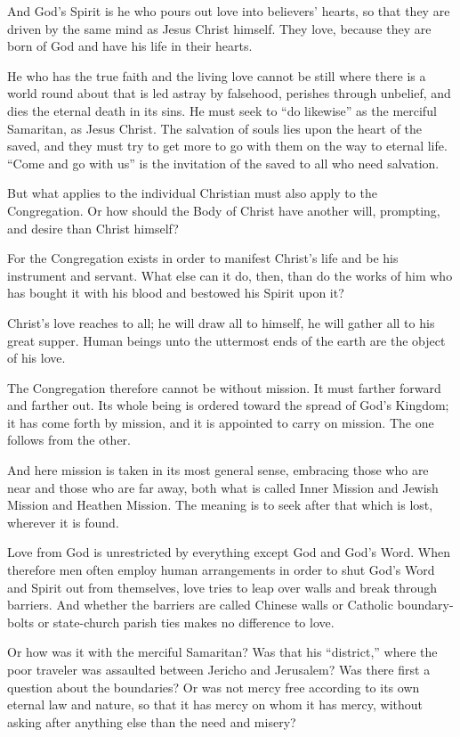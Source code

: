 And God’s Spirit is he who pours out love into believers’ hearts, so that they are driven by the same mind as Jesus Christ himself. They love, because they are born of God and have his life in their hearts.

He who has the true faith and the living love cannot be still where there is a world round about that is led astray by falsehood, perishes through unbelief, and dies the eternal death in its sins. He must seek to “do likewise” as the merciful Samaritan, as Jesus Christ. The salvation of souls lies upon the heart of the saved, and they must try to get more to go with them on the way to eternal life. “Come and go with us” is the invitation of the saved to all who need salvation.

But what applies to the individual Christian must also apply to the Congregation. Or how should the Body of Christ have another will, prompting, and desire than Christ himself?

For the Congregation exists in order to manifest Christ’s life and be his instrument and servant. What else can it do, then, than do the works of him who has bought it with his blood and bestowed his Spirit upon it?

Christ’s love reaches to all; he will draw all to himself, he will gather all to his great supper. Human beings unto the uttermost ends of the earth are the object of his love.

The Congregation therefore cannot be without mission. It must farther forward and farther out. Its whole being is ordered toward the spread of God’s Kingdom; it has come forth by mission, and it is appointed to carry on mission. The one follows from the other.

And here mission is taken in its most general sense, embracing those who are near and those who are far away, both what is called Inner Mission and Jewish Mission and Heathen Mission. The meaning is to seek after that which is lost, wherever it is found.

Love from God is unrestricted by everything except God and God’s Word. When therefore men often employ human arrangements in order to shut God’s Word and Spirit out from themselves, love tries to leap over walls and break through barriers. And whether the barriers are called Chinese walls or Catholic boundary-bolts or state-church parish ties makes no difference to love.

Or how was it with the merciful Samaritan? Was that his “district,” where the poor traveler was assaulted between Jericho and Jerusalem? Was there first a question about the boundaries? Or was not mercy free according to its own eternal law and nature, so that it has mercy on whom it has mercy, without asking after anything else than the need and misery?


